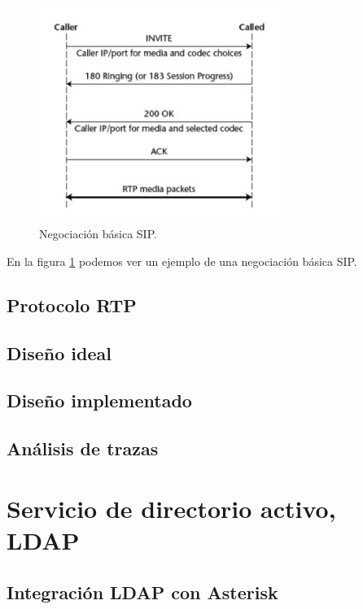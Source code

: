 \documentclass[a4paper]{article}
\begin{document}
\begin{figure}[h]
    \begin{center}
        \includegraphics[width=0.7\textwidth]{sip-register.jpg}
         \caption{Negociación básica SIP.}
        
    \end{center}
    \label{fig:1}
\end{figure}

En la figura \ref{fig:1} podemos ver un ejemplo de una negociación básica SIP.

\subsection{Protocolo RTP}

\subsection{Diseño ideal}
\subsection{Diseño implementado}
\subsection{Análisis de trazas}

\section{Servicio de directorio activo, LDAP}
\subsection{Integración LDAP con Asterisk}
\end{document}
